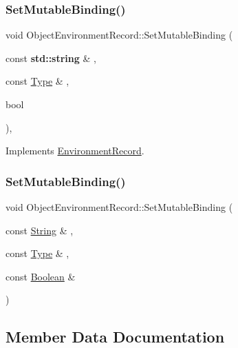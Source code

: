 \subsubsection{\texorpdfstring{Set\+Mutable\+Binding()}{SetMutableBinding()}\hspace{0.1cm}{\footnotesize\ttfamily [1/2]}}
{\footnotesize\ttfamily void Object\+Environment\+Record\+::\+Set\+Mutable\+Binding (\begin{DoxyParamCaption}\item[{const \textbf{ std\+::string} \&}]{,  }\item[{const \hyperlink{class_type}{Type} \&}]{,  }\item[{bool}]{ }\end{DoxyParamCaption})\hspace{0.3cm}{\ttfamily [final]}, {\ttfamily [virtual]}}



Implements \hyperlink{struct_environment_record_a9d5250a9cc6fa4d1f9ecbf5213b6cb24}{Environment\+Record}.

\mbox{\label{struct_object_environment_record_a495af7053fd2a7b122a56b31418f7324}} 
\subsubsection{\texorpdfstring{Set\+Mutable\+Binding()}{SetMutableBinding()}\hspace{0.1cm}{\footnotesize\ttfamily [2/2]}}
{\footnotesize\ttfamily void Object\+Environment\+Record\+::\+Set\+Mutable\+Binding (\begin{DoxyParamCaption}\item[{const \hyperlink{struct_string}{String} \&}]{,  }\item[{const \hyperlink{class_type}{Type} \&}]{,  }\item[{const \hyperlink{struct_boolean}{Boolean} \&}]{ }\end{DoxyParamCaption})\hspace{0.3cm}{\ttfamily [final]}}



\subsection{Member Data Documentation}
\mbox{\label{struct_object_environment_record_ac373ab33014da05eb9d81ed78429b1ca}} 
